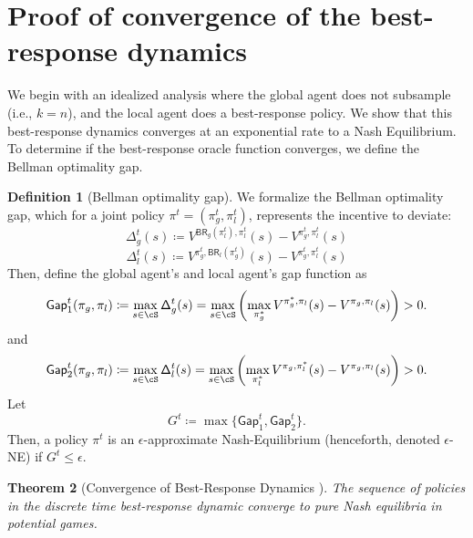 \documentclass{article}
\theoremstyle{plain}
\newtheorem{theorem}{Theorem}[section]
\theoremstyle{definition}
\newtheorem{definition}[theorem]{Definition}
\begin{document}
 
\section{Proof of convergence of the best-response dynamics}

\label{sec: proof of convergence of BR dynamics}
We begin with an idealized analysis where the global agent does not subsample (i.e., $k=n$), and the local agent does a best-response policy. We show that this best-response dynamics converges at an exponential rate to a Nash Equilibrium. To determine if the best-response oracle function converges, we define the Bellman optimality gap.

\begin{definition}[Bellman optimality gap] We formalize the Bellman optimality gap, which for a joint policy $\pi^t = (\pi_g^t, \pi_l^t)$, represents the incentive to deviate: \[\mathsf{\Delta}_g^t(s) \coloneqq V^{\mathsf{BR}_g(\pi_l^t), \pi_l^t}(s) - V^{\pi_g^t, \pi_l^t}(s)\]
\[
\mathsf{\Delta}_l^t(s) \coloneqq V^{\pi_g^t, \mathsf{BR}_l(\pi_g^t)}(s) - V^{\pi_g^t, \pi_l^t}(s)\]
Then, define the global agent's and local agent's gap function as
\[\mathsf{Gap}^t_1(\pi_g,\pi_l) \coloneqq \max_{s\in \cS} \mathsf{\Delta}_g^t(s) =  \max_{s\in\cS}\left(\max_{\pi_g^*}V^{\pi^*_g,\pi_l}(s) - V^{\pi_g,\pi_l}(s)\right) > 0.\]
and 
\[\mathsf{Gap}^t_2(\pi_g,\pi_l) \coloneqq \max_{s\in \cS}\mathsf{\Delta}_l^t(s) =  \max_{s\in\cS}\left(\max_{\pi_l^*}V^{\pi_g,\pi_l^*}(s) - V^{\pi_g,\pi_l}(s)\right) > 0.\]
Let \[G^t \coloneqq \max\{\mathsf{Gap}_1^t, \mathsf{Gap}_2^t\}.\]
Then, a policy $\pi^t$ is an $\epsilon$-approximate Nash-Equilibrium (henceforth, denoted $\epsilon$-NE) if $G^t\leq \epsilon$.\\
\end{definition}

\begin{theorem}[Convergence of Best-Response Dynamics
    \cite{Monderer1996,Young:2004}] \label{thm: convergence of br dynamics} The sequence of policies in the discrete time best-response dynamic converge to pure Nash equilibria in potential games.\\
\end{theorem}
\end{document}
